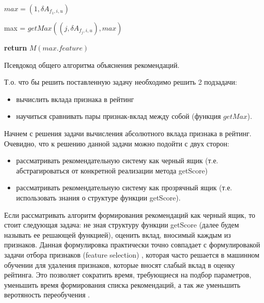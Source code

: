 \documentclass[12pt,a4paper]{report}
\begin{document}
\begin{algorithm}[H]
\SetAlgoLined
{}

$max = (1, \delta A_{f_1, i, u})$

 {
	
	max = $getMax((j, \delta A_{f_j, i, u}), max)$
	
}

\textbf{return} $M(max.feature)$

\caption{Псевдокод общего алгоритма объяснения рекомендаций.}
\label{alg:GENERALENT}
\end{algorithm}

Т.о. что бы решить поставленную задачу необходимо решить 2 подзадачи:

\begin{itemize}
\item вычислить вклада признака в рейтинг
\item научиться сравнивать пары признак-вклад между собой (функция $getMax$).
\end{itemize}

Начнем с решения задачи вычисления абсолютного вклада признака в рейтинг. Очевидно, что к решению данной задачи можно подойти с двух сторон:
\begin{itemize}
\item рассматривать рекомендательную систему как черный ящик (т.е. абстрагироваться от конкретной реализации метода getScore)
\item рассматривать рекомендательную систему как прозрячный ящик (т.е. использовать знания о структуре функции getScore).
\end{itemize}

Если рассматривать алгоритм формирования рекомендаций как черный ящик, то стоит следующая задача: не зная структуру функции getScore (далее будем называть ее решающей функцией), оценить вклад, вносимый каждым из признаков.
Данная формулировка практически точно совпадает с формулировакой задачи отбора признаков (feature selection) \cite{AdvFeatureSelectionResearch}, которая часто решается в машинном обучении для удаления признаков, которые вносят слабый вклад в оценку рейтинга. Это позволяет сократить время, требующиеся на подбор параметров, уменьшить время формирования списка рекомендаций, а так же уменьшить веротяность переобучения \cite{Voron}.
\end{document}
